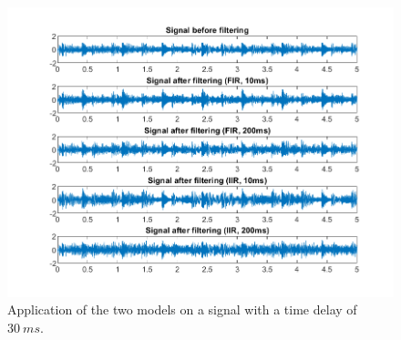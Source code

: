 \documentclass[journal]{IEEEtran}
\begin{document}
\begin{figure}
    \centering
    \includegraphics[width=\linewidth]{assignment_01/plots/bounce_signals.png}
    \caption{Application of the two models on a signal with a time delay of $\SI{30}{ms}$.}
    \label{fig:bounce:signals}
\end{figure}

\newpage
\end{document}
